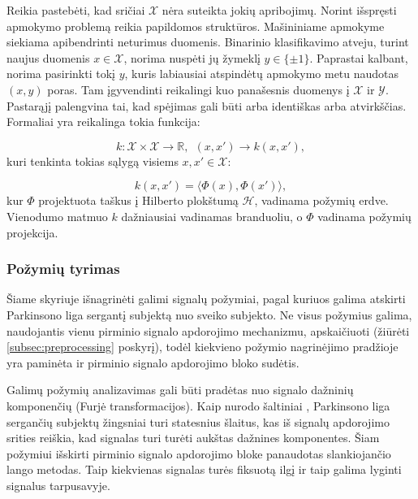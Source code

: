 \documentclass[]{vgtuef}
\begin{document}
Reikia pastebėti, kad sričiai $\mathcal{X}$ nėra suteikta jokių apribojimų. Norint išspręsti apmokymo problemą reikia papildomos struktūros. Mašininiame apmokyme siekiama apibendrinti neturimus duomenis. Binarinio klasifikavimo atveju, turint naujus duomenis $x \in \mathcal{X}$, norima nuspėti jų žymeklį $y \in \{\pm 1\}$. Paprastai kalbant, norima pasirinkti tokį $y$, kuris labiausiai atspindėtų apmokymo metu naudotas $(x,y)$ poras. Tam įgyvendinti reikalingi kuo panašesnis duomenys į $\mathcal{X}$ ir $\mathcal{Y}$. Pastarąjį palengvina tai, kad spėjimas gali būti arba identiškas arba atvirkščias. Formaliai yra reikalinga tokia funkcija:

\begin{equation}
  k: \mathcal{X} \times \mathcal{X} \rightarrow \mathbb{R}, ~~ (x,x')
  \rightarrow k(x,x'),
\end{equation}
kuri tenkinta tokias sąlygą visiems $x,x' \in \mathcal{X}$:

\begin{equation}
  k(x,x') = \langle \Phi(x), \Phi(x') \rangle,
\end{equation}
kur $\Phi$ projektuota taškus į Hilberto plokštumą $\mathcal{H}$, vadinama požymių erdve. Vienodumo matmuo $k$ dažniausiai vadinamas branduoliu, o $\Phi$ vadinama požymių projekcija.

\subsubsection{Požymių tyrimas}

Šiame skyriuje išnagrinėti galimi signalų požymiai, pagal kuriuos galima atskirti Parkinsono liga sergantį subjektą nuo sveiko subjekto. Ne visus požymius galima, naudojantis vienu pirminio signalo apdorojimo mechanizmu, apskaičiuoti (žiūrėti \ref{subsec:preprocessing} poskyrį), todėl kiekvieno požymio nagrinėjimo pradžioje yra paminėta ir pirminio signalo apdorojimo bloko sudėtis.

Galimų požymių analizavimas gali būti pradėtas nuo signalo dažninių komponenčių (Furjė transformacijos). Kaip nurodo šaltiniai \cite{wiki_parkinsons},  Parkinsono liga sergančių subjektų žingsniai turi statesnius šlaitus, kas iš signalų apdorojimo srities reiškia, kad signalas turi turėti aukštas dažnines komponentes. Šiam požymiui išskirti pirminio signalo apdorojimo bloke panaudotas slankiojančio lango metodas. Taip kiekvienas signalas turės fiksuotą ilgį ir taip galima lyginti signalus tarpusavyje.
\end{document}
